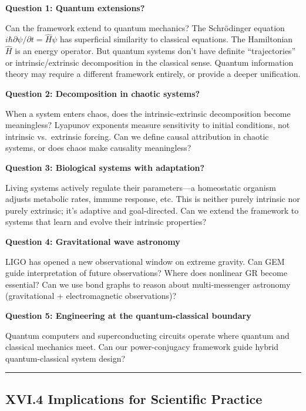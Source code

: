 \documentclass[
]{article}
\begin{document}
\textbf{Question 1: Quantum extensions?}

Can the framework extend to quantum mechanics? The Schrödinger equation
\(i\hbar \partial \psi / \partial t = \hat{H} \psi\) has superficial
similarity to classical equations. The Hamiltonian \(\hat{H}\) is an
energy operator. But quantum systems don't have definite
``trajectories'' or intrinsic/extrinsic decomposition in the classical
sense. Quantum information theory may require a different framework
entirely, or provide a deeper unification.

\textbf{Question 2: Decomposition in chaotic systems?}

When a system enters chaos, does the intrinsic-extrinsic decomposition
become meaningless? Lyapunov exponents measure sensitivity to initial
conditions, not intrinsic vs.~extrinsic forcing. Can we define causal
attribution in chaotic systems, or does chaos make causality
meaningless?

\textbf{Question 3: Biological systems with adaptation?}

Living systems actively regulate their parameters---a homeostatic
organism adjusts metabolic rates, immune response, etc. This is neither
purely intrinsic nor purely extrinsic; it's adaptive and goal-directed.
Can we extend the framework to systems that learn and evolve their
intrinsic properties?

\textbf{Question 4: Gravitational wave astronomy}

LIGO has opened a new observational window on extreme gravity. Can GEM
guide interpretation of future observations? Where does nonlinear GR
become essential? Can we use bond graphs to reason about multi-messenger
astronomy (gravitational + electromagnetic observations)?

\textbf{Question 5: Engineering at the quantum-classical boundary}

Quantum computers and superconducting circuits operate where quantum and
classical mechanics meet. Can our power-conjugacy framework guide hybrid
quantum-classical system design?

\begin{center}\rule{0.5\linewidth}{0.5pt}\end{center}

\subsection{XVI.4 Implications for Scientific
Practice}\label{xvi.4-implications-for-scientific-practice}
\end{document}

